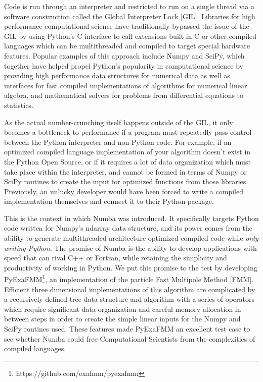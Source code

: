 \documentclass{IEEEcsmag}
\begin{document}
Code is run through an interpreter and restricted to run on a single thread via a software construction called the Global Interpreter Lock [GIL]. Libraries for high performance computational science have traditionally bypassed the issue of the GIL by using Python's C interface to call extensions built in C or other compiled languages which can be multithreaded and compiled to target special hardware features. Popular examples of this approach include Numpy and SciPy, which together have helped propel Python's popularity in computational science by providing high performance data structures for numerical data as well as interfaces for fast compiled implementations of algorithms for numerical linear algebra, and mathematical solvers for problems from differential equations to statistics.

As the actual number-crunching itself happens outside of the GIL, it only becomes a bottleneck to performance if a program must repeatedly pass control between the Python interpreter and non-Python code. For example, if an optimized compiled language implementation of your algorithm doesn't exist in the Python Open Source, or if it requires a lot of data organization which must take place within the interpreter, and cannot be formed in terms of Numpy or SciPy routines to create the input for optimized functions from those libraries. Previously, an unlucky developer would have been forced to write a compiled implementation themselves and connect it to their Python package.

This is the context in which Numba was introduced. It specifically targets Python code written for Numpy's ndarray data structure, and its power comes from the ability to generate multithreaded architecture optimized compiled code while \textit{only writing Python}. The promise of Numba is the ability to develop applications with speed that can rival C++ or Fortran, while retaining the simplicity and productivity of working in Python. We put this promise to the test by developing PyExaFMM\footnote{https://github.com/exafmm/pyexafmm}, an implementation of the particle Fast Multipole Method [FMM]. Efficient three dimensional implementations of this algorithm are complicated by a recursively defined tree data structure and algorithm with a series of operators which require significant data organization and careful memory allocation in between steps in order to create the simple linear inputs for the Numpy and SciPy routines used. These features made PyExaFMM an excellent test case to see whether Numba could free Computational Scientists from the complexities of compiled languages.
\end{document}
